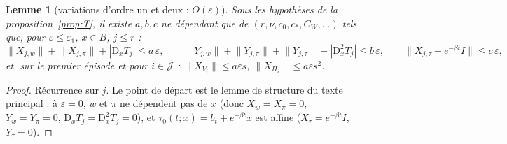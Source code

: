 \documentclass[11pt,a4paper]{article}
\newtheorem{lemme}[theoreme]{Lemme}
\theoremstyle{remark}
\theoremstyle{definition}
\newcommand{\norm}[1]{\lVert #1\rVert}
\newcommand{\eps}{\varepsilon}
\newcommand{\D}{\mathrm D}
\begin{document}
\begin{lemme}[variations d'ordre un et deux : $O(\eps)$]\label{lem:V}
Sous les hypothèses de la proposition~\ref{prop:T}, il existe $a,b,c$ ne dépendant que de $(r,\nu,c_0,c_*,C_W,\ldots)$ tels que, pour $\eps\le\eps_1$, $x\in B$, $j\le r$ :
\[
\norm{X_{j,w}}+\norm{X_{j,\pi}}+|\D_xT_j|\le a\,\eps,\qquad
\norm{Y_{j,w}}+\norm{Y_{j,\pi}}+\norm{Y_{j,\tau}}+|\D_x^2T_j|\le b\,\eps,\qquad
\norm{X_{j,\tau}-e^{-\beta t}I}\le c\,\eps,
\]
et, sur le premier épisode et pour $i\in\mathcal J$ : $\norm{X_{V_i}}\le a\eps s$, $\norm{X_{H_i}}\le a\eps s^2$.
\end{lemme}

\begin{proof}
Récurrence sur $j$. Le point de départ est le lemme de structure du texte principal : à $\eps=0$, $w$ et $\pi$ ne dépendent pas de $x$ (donc $X_w=X_\pi=0$, $Y_w=Y_\pi=0$, $\D_xT_j=\D^2_xT_j=0$), et $\tau_0(t;x)=b_t+e^{-\beta t}x$ est affine ($X_\tau=e^{-\beta t}I$, $Y_\tau=0$).


\end{proof}
\end{document}
